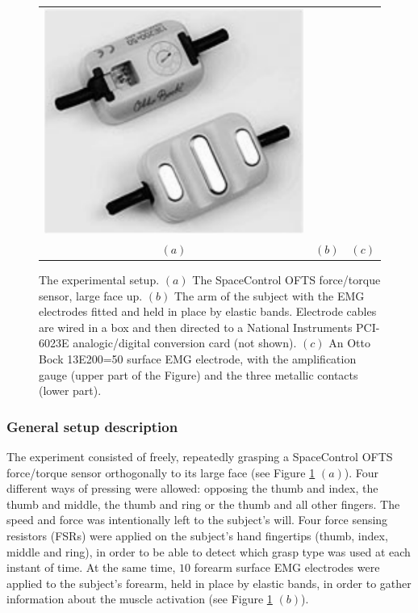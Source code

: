 \begin{figure}[!t]
\begin{tabular}{ccc}
    \includegraphics[height=0.16\textheight]{figs/ottobock} \\
    $(a)$ & $(b)$ & $(c)$ \\
  \end{tabular}
  \caption{The experimental setup. $(a)$ The SpaceControl OFTS
    force/torque sensor, large face up. $(b)$
    The arm of the subject with the EMG electrodes fitted and held in
    place by elastic bands. Electrode cables are wired in a box and
    then directed to a National Instruments PCI-6023E analogic/digital
    conversion card (not shown). $(c)$ An Otto Bock 13E200=50
    surface EMG electrode, with the amplification gauge (upper part of
    the Figure) and the three metallic contacts (lower part).}
  \label{fig:setup}
\end{figure}

\subsubsection{General setup description}

The experiment consisted of freely, repeatedly grasping a SpaceControl
OFTS force/torque sensor \cite{ofts} orthogonally to its large face
(see Figure \ref{fig:setup} $(a)$). Four different ways of pressing
were allowed: opposing the thumb and index, the thumb and middle, the
thumb and ring or the thumb and all other fingers. The speed and force
was intentionally left to the subject's will. Four force sensing
resistors (FSRs) were applied on the subject's hand fingertips (thumb,
index, middle and ring), in order to be able to detect which grasp
type was used at each instant of time. At the same time, $10$ forearm
surface EMG electrodes were applied to the subject's forearm, held in
place by elastic bands, in order to gather information about the
muscle activation (see Figure \ref{fig:setup} $(b)$).

